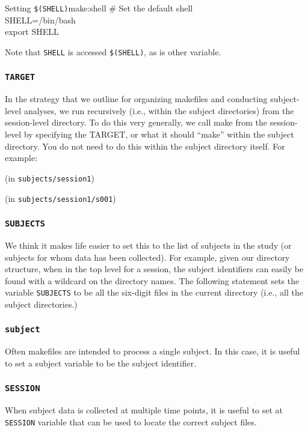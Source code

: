 \begin{make}{Setting \texttt{\$(SHELL)}}{make:shell}
	\# Set the default shell \\
	SHELL=/bin/bash \\
	export SHELL
\end{make}

Note that \texttt{SHELL} is accessed \texttt{\$(SHELL)}, as is other \maken{} variable. 

\subsubsection{\texttt{TARGET}}
In the strategy that we outline for organizing makefiles and conducting subject-level analyses, we run \maken{} recursively (i.e., within the subject directories) from the session-level directory. To do this very generally, we call make from the session-level by specifying the TARGET, or what it should ``make'' within the subject directory. You do not need to do this within the subject directory itself. For example:

(in \texttt{subjects/session1})


(in \texttt{subjects/session1/s001})


\subsubsection{\texttt{SUBJECTS}}
We think it makes life easier to set this to the list of subjects in the study (or subjects for whom data has been collected). For example, given our directory structure, when in the top level for a session, the subject identifiers can easily be found with a wildcard on the directory names. The following statement sets the variable \texttt{SUBJECTS} to be all the six-digit files in the current directory (i.e., all the subject directories.) 


\subsubsection{\texttt{subject}}
Often makefiles are intended to process a single subject. In this case, it is useful to set a subject variable to be the subject identifier.

\subsubsection{\texttt{SESSION}}
When subject data is collected at multiple time points, it is useful to set at \texttt{SESSION} variable that can be used to locate the correct subject files. 

